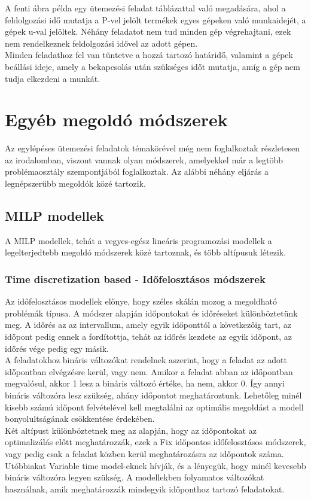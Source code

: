 \documentclass {report}
\begin{document}
A fenti ábra példa egy ütemezési feladat táblázattal való megadására, ahol a feldolgozási idő mutatja a P-vel jelölt termékek egyes gépeken való munkaidejét, a gépek u-val jelöltek. Néhány feladatot nem tud minden gép végrehajtani, ezek nem rendelkeznek feldolgozási idővel az adott gépen. \\
Minden feladathoz fel van tüntetve a hozzá tartozó határidő, valamint a gépek beállási ideje, amely a bekapcsolás után szükséges időt mutatja, amíg a gép nem tudja elkezdeni a munkát. 

\section{Egyéb megoldó módszerek}
Az egylépéses ütemezési feladatok témakörével még nem foglalkoztak részletesen az irodalomban, viszont vannak olyan módszerek, amelyekkel már a legtöbb problémaosztály szempontjából foglalkoztak. Az alábbi néhány eljárás a legnépszerűbb megoldók közé tartozik.


\subsection{MILP modellek}
  A MILP modellek, tehát a vegyes-egész lineáris programozási modellek a legelterjedtebb megoldó módszerek közé tartoznak, és több altípusuk létezik.
  \subsubsection{Time discretization based - Időfelosztásos módszerek}
   Az időfelosztásos modellek előnye, hogy széles skálán mozog a megoldható problémák típusa.
  A módszer alapján időpontokat és időréseket különböztetünk meg. A időrés az az intervallum, amely egyik időponttól a következőig tart, az időpont pedig ennek a fordítottja, tehát az időrés kezdete az egyik időpont, az időrés vége pedig egy másik. \\
  A feladatokhoz bináris változókat rendelnek aszerint, hogy a feladat az adott időpontban elvégzésre kerül, vagy nem. Amikor a feladat abban az időpontban megvalósul, akkor 1 lesz a bináris változó értéke, ha nem, akkor 0. Így annyi bináris változóra lesz szükség, ahány időpontot meghatároztunk. Lehetőleg minél kisebb számú időpont felvételével kell megtalálni az optimális megoldást a modell bonyolultságának csökkentése érdekében.\\  
  
 Két altípust különböztetnek meg az alapján, hogy az időpontokat az optimalizálás előtt meghatározzák, ezek a Fix időpontos időfelosztásos módszerek, vagy pedig csak a feladat közben kerül meghatározásra az időpontok száma. Utóbbiakat Variable time model-eknek hívják, és a lényegük, hogy minél kevesebb bináris változóra legyen szükség. A modellekben folyamatos változókat használnak, amik meghatározzák mindegyik időponthoz tartozó feladatokat. 
 
\end{document}
